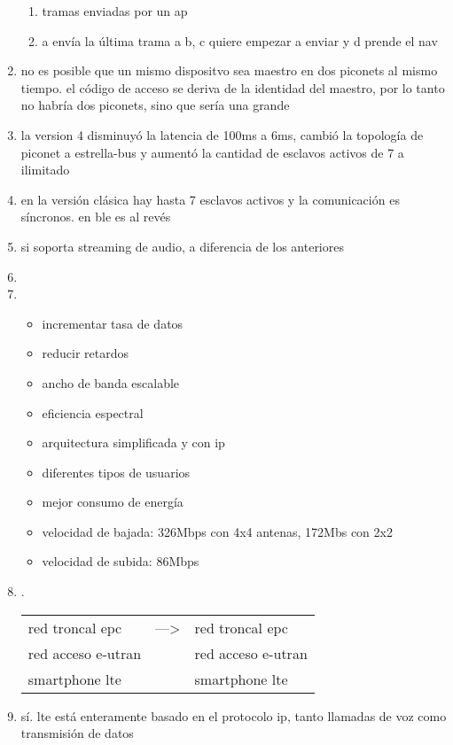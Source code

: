 \documentclass[11pt]{article}
\begin{document}
\begin{enumerate}
\begin{enumerate}
\item tramas enviadas por un ap
\item a envía la última trama a b, c quiere empezar a enviar y d prende el nav
\end{enumerate}
\item no es posible que un mismo dispositvo sea maestro en dos piconets al mismo tiempo. el código de acceso se deriva de la identidad del maestro, por lo tanto no habría dos piconets, sino que sería una grande
\item la version 4 disminuyó la latencia de 100ms a 6ms, cambió la topología de piconet a estrella-bus y aumentó la cantidad de esclavos activos de 7 a ilimitado
\item en la versión clásica hay hasta 7 esclavos activos y la comunicación es síncronos. en ble es al revés
\item si soporta streaming de audio, a diferencia de los anteriores
\item 

\item \begin{itemize}
\item incrementar tasa de datos
\item reducir retardos
\item ancho de banda escalable
\item eficiencia espectral
\item arquitectura simplificada y con ip
\item diferentes tipos de usuarios
\item mejor consumo de energía
\item velocidad de bajada: 326Mbps con 4x4 antenas, 172Mbs con 2x2
\item velocidad de subida: 86Mbps
\end{itemize}
\item .
\begin{center}
\begin{tabular}{lll}
red troncal epc & ---> & red troncal epc\\
red acceso e-utran &  & red acceso e-utran\\
smartphone lte &  & smartphone lte\\
\end{tabular}
\end{center}
\item sí. lte está enteramente basado en el protocolo ip, tanto llamadas de voz como transmisión de datos
\end{enumerate}
\end{document}

